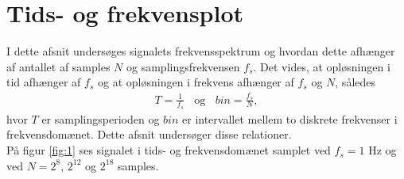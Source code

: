 \section{Tids- og frekvensplot}
I dette afsnit undersøges signalets frekvensspektrum og hvordan dette afhænger af antallet af samples $N$ og samplingsfrekvensen $f_s$. Det vides, at opløsningen i tid afhænger af $f_s$ og at opløsningen i frekvens afhænger af $f_s$ og $N$, således
\begin{align*}\label{eq:tidsoploesning}
T = \frac{1}{f_s}\phantom{m}\text{og}\phantom{m} bin=\frac{f_s}{N},
\end{align*}
hvor $T$ er samplingsperioden og $bin$ er intervallet mellem to diskrete frekvenser i frekvensdomænet. Dette afsnit undersøger disse relationer.\\
På figur \ref{fig:1} ses signalet i tids- og frekvensdomænet samplet ved $f_s=1$ Hz og ved $N=2^8$, $2^{12}$ og $2^{18}$ samples.
